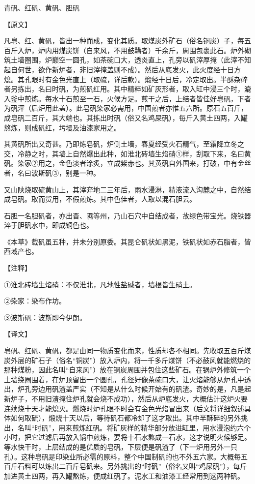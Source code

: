 \documentclass[12pt,UTF8]{ctexbook}
\begin{document}
青矾、红矾、黄矾、胆矾

【原文】

凡皂、红、黄矾，皆出一种而成，变化其质。取煤炭外矿石（俗名铜炭）子，每五百斤入炉，炉内用煤炭饼（自来风，不用鼓鞲者）千余斤，周围包裹此石。炉外砌筑土墙圈围，炉巅空一圆孔，如茶碗口大，透炎直上，孔旁以矾滓厚掩（此滓不知起自何世，欲作新炉者，非旧滓掩盖则不成）。然后从底发火，此火度经十日方熄。其孔眼时有金色光直上（取硫，详后款）。煅经十日后，冷定取出。半酥杂碎者另拣出，名曰时矾，为煎矾红用。其中精粹如矿灰形者，取入缸中浸三个时，漉入釜中煎炼。每水十石煎至一石，火候方足。煎干之后，上结者皆佳好皂矾，下者为矾滓（后炉用此盖）。此皂矾染家必需用，中国煎者亦惟五六所。原石五百斤，成皂矾二百斤，其大端也。其拣出时矾（俗又名鸡屎矾），每斤入黄土四两，入罐熬炼，则成矾红，圬墁及油漆家用之。

其黄矾所出又奇甚。乃即炼皂矾，炉侧土墙，春夏经受火石精气，至霜降立冬之交，冷静之时，其墙上自然爆出此种，如淮北砖墙生焰硝①样，刮取下来，名曰黄矾。染家②用之，金色淡者涂炙，立成紫赤也。其黄矾自外国来，打破，中有金丝者，名曰波斯矾③，别是一种。

又山陕烧取硫黄山上，其滓弃地二三年后，雨水浸淋，精液流入沟麓之中，自然结成皂矾。取而货用，不假煎炼。其中色佳者，人取以混石胆云。

石胆一名胆矾者，亦出晋、隰等州，乃山石穴中自结成者，故绿色带宝光。烧铁器淬于胆矾水中，即成铜色也。

《本草》载矾虽五种，并未分别原委。其昆仑矾状如黑泥，铁矾状如赤石脂者，皆西域产也。

【注释】

①淮北砖墙生焰硝：不仅淮北，凡地性盐碱者，墙根皆生硝土。

②染家：染布作坊。

③波斯矾：波斯即今伊朗。

【译文】

皂矾、红矾、黄矾，都是由同一物质变化而来，性质却各不相同。先收取五百斤煤炭外层的矿石子（俗名“铜炭”）放入炉内，将一千多斤煤饼（不必鼓风就能燃烧的那种煤粉，因此名叫“自来风”）放在铜炭周围并包住这些矿石。在锅炉外修筑一个土墙绕圈围着，在炉顶留出一个圆孔，孔径好像茶碗口大，让火焰能够从炉孔中透出，炉孔旁边用矾渣盖严实（不知是从什么时候开始有的矾渣。奇妙的是，凡是起新炉子，不用旧渣掩住炉孔就会烧不成功），然后从炉底发火，大概估计这炉火要连续烧十天才能熄灭。燃烧时炉孔眼不时会有金色光焰冒出来（后文将详细叙述具体如何取硫），煅烧十天以后，等待矾石都冷却了这才取出。其中半酥碎的另外挑出，名叫“时矾”，用来煎炼红矾。将矿灰样的精华部分放进缸里，用水浸泡约六个小时，把它过滤后再放入锅中煎炼，要将十石水熬成一石水，这才说明火候够足。等水快干时，上层结成的是优质的皂矾，下层便是矾渣了（下一炉用另外一只孔）。这种皂矾是印染业所必需的原料，整个中国制矾的也不外五六家。大概每五百斤石料可以炼出二百斤皂矾来。另外挑出的“时矾”（俗名又叫“鸡屎矾”），每斤加进黄土四两，再入罐熬炼，便成红矾了。泥水工和油漆工经常用到这两种矾。
\end{document}

